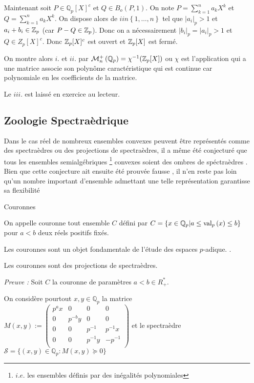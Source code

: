 Maintenant soit $P \in \mathbb{Q}_{ p } [X]^c$ et $Q \in B_o\left( P, 1 \right) $. On note $P = \sum_{k=1}^{n} a_k X^k$ et $Q = \sum_{k=1}^{n} a_k X^k$. On dispose alors de $i in \left\{  1,\ldots,n \right\} $ tel que $|a_{i}|_p >1$ et $a_i + b_{i} \in  \mathbb {Z}_p $ (car $P-Q \in  \mathbb {Z}_p $). Donc on a nécessairement $|b_i|_p = |a_i|_p > 1$ et $Q \in Z_p[X]^c$.
Donc $ \mathbb {Z}_p [X]^c$ est ouvert et $ \mathbb {Z}_p [X]$ est fermé. 

\fi
On montre alors $i.$ et $ii.$ par $\mathcal{M}^+_{n}\left(\mathbb{Q}_{p} \right)  = \chi^{-1}(  \mathbb {Z}_p [X]) $ ou $\chi$ est l'application qui a une matrice associe son polynôme caractéristique qui est continue car polynomiale en les coefficients de la matrice.

Le $iii$. est laissé en exercice au lecteur. 


\subsection{Zoologie Spectraèdrique}
Dans le cas réel de nombreux ensembles convexes peuvent être représentés comme des spectraèdres ou des projections de spectraèdres, il a même été conjecturé que tous les ensembles semialgébriques \footnote{$i.e.$ les ensembles définis par des inégalités polynomiales} convexes soient des ombres de spéctraèdres . Bien que cette conjecture ait ensuite été prouvée fausse , il n'en reste pas loin qu'un nombre important d'ensemble admettant une telle représentation garantisse sa flexibilité 

\begin{definition}
	Couronnes

	On appelle couronne tout ensemble $C$ défini par $C = \{x \in \mathbb{Q}_{p}  | a\le \text{val}_p\left(x\right) \le b\} $ pour $a < b$ deux réels positifs fixés.
\end{definition}

Les couronnes sont un objet fondamentale de l'étude des espaces $p$-adique. . 
\begin{proposition}
	Les couronnes sont des projections de spectraèdres.
\end{proposition} 

\textit{Preuve :}
Soit $C$ la couronne de paramètres $a<b \in R^*_+$.

On considère pourtout $x,y \in \mathbb{Q}_{p} $ la matrice  $M(x,y) :=
\begin{pmatrix} 
p^ax & 0 & 0 & 0 \\
0 & p^{-b}y & 0 & 0 \\
0 & 0 & p^{-1} & p^{-1}x \\
0 & 0 & p^{-1}y & - p^{-1}  \\
\end{pmatrix} $ et le spectraèdre $\mathcal{S}= \{(x,y) \in \mathbb{Q}_{p}  : M(x,y) \succeq 0\} $

